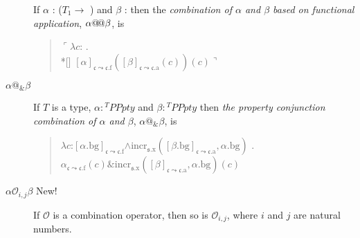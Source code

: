 \begin{description}
  If $\alpha$ : ($T_1\rightarrow$ ) 
                         and $\beta$ : 
                         then the \textit{combination of $\alpha$ and
    $\beta$  based on functional application}, $\alpha\text{@\!@}\beta$, is
  \begin{quote}
    $\ulcorner\lambda c$:
      . \\*[\baselineskip]
      \hspace*{10em}$[\alpha]_{\mathfrak{c}\leadsto\mathfrak{c}.\text{f}}([\beta]_{\mathfrak{c}\leadsto\mathfrak{c}.\text{a}}(c))(c)\urcorner$
    \end{quote}

    \item[\textnormal{$\alpha\text{@}_{\&}\beta$}] \mbox{}

  If $T$ is a type, $\alpha:{^T\textit{PPpty}}$ and
  $\beta:{^T\textit{PPpty}}$ 
  then \textit{the property conjunction
    combination of $\alpha$ and $\beta$}, $\alpha\text{@}_{\&}\beta$,
  is
\begin{quote}
  $\lambda
  c$:$[\alpha.\text{bg}]_{\mathfrak{c}\leadsto\mathfrak{c}.\text{f}}$\d{$\wedge$}$\mathrm{incr}_{\mathfrak{s}.\text{x}}([\beta.\text{bg}]_{\mathfrak{c}\leadsto\mathfrak{c}.\text{a}},\alpha.\text{bg})$
        . $\alpha_{\mathfrak{c}\leadsto\mathfrak{c}.\text{f}}(c)\&\mathrm{incr}_{\mathfrak{s}.\text{x}}([\beta]_{\mathfrak{c}\leadsto\mathfrak{c}.\text{a}},\alpha.\text{bg})(c)$
      \end{quote}

     
    \item[\textnormal{$\alpha\mathcal{O}_{i,j}\beta$} New!] \mbox{}

      If $\mathcal{O}$ is a combination operator, then so is
$\mathcal{O}_{i,j}$, where $i$ and $j$ are natural numbers.


\end{description}
